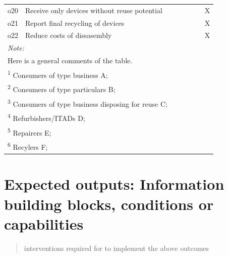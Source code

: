 \documentclass[
]{book}
\begin{document}
\begin{table}
{\begin{tabular}[t]{llllllll}
o20 & Receive only devices without reuse potential &  &  &  &  &  & X\\
o21 & Report final recycling of devices &  &  &  &  &  & X\\
o22 & Reduce costs of dissasembly &  &  &  &  &  & X\\
\bottomrule
\multicolumn{8}{l}{\rule{0pt}{1em}\textit{Note: }}\\
\multicolumn{8}{l}{\rule{0pt}{1em}Here is a general comments of the table. }\\
\multicolumn{8}{l}{\rule{0pt}{1em}\textsuperscript{1} Consumers of type business A; }\\
\multicolumn{8}{l}{\rule{0pt}{1em}\textsuperscript{2} Consumers of type particulars B; }\\
\multicolumn{8}{l}{\rule{0pt}{1em}\textsuperscript{3} Consumers of type business disposing for reuse C; }\\
\multicolumn{8}{l}{\rule{0pt}{1em}\textsuperscript{4} Refurbishers/ITADs D; }\\
\multicolumn{8}{l}{\rule{0pt}{1em}\textsuperscript{5} Repairers E; }\\
\multicolumn{8}{l}{\rule{0pt}{1em}\textsuperscript{6} Recylers F; }\\
\end{tabular}}
\end{table}

\hypertarget{expected-outputs-information-building-blocks-conditions-or-capabilities}{%
\section{Expected outputs: Information building blocks, conditions or capabilities}\label{expected-outputs-information-building-blocks-conditions-or-capabilities}}

\begin{quote}
interventions required for to implement the above outcomes
\end{quote}
\end{document}
